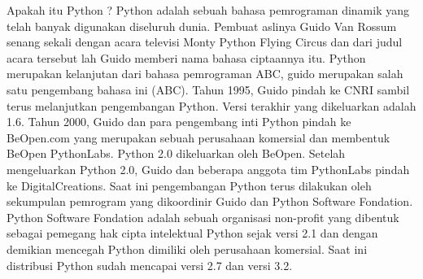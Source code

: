 {\fontsize{14pt}{14pt}\selectfont Apakah itu Python ?\vspace{\baselineskip}
Python adalah sebuah bahasa pemrograman dinamik yang telah banyak\vspace{\baselineskip}
digunakan diseluruh dunia. Pembuat aslinya Guido Van Rossum senang sekali dengan\vspace{\baselineskip}
acara televisi Monty Python Flying Circus dan dari judul acara tersebut lah Guido\vspace{\baselineskip}
memberi nama bahasa ciptaannya itu. Python merupakan kelanjutan dari bahasa\vspace{\baselineskip}
pemrograman ABC, guido merupakan salah satu pengembang bahasa ini (ABC).\vspace{\baselineskip}
Tahun 1995, Guido pindah ke CNRI sambil terus melanjutkan pengembangan\vspace{\baselineskip}
Python. Versi terakhir yang dikeluarkan adalah 1.6. Tahun 2000, Guido dan para\vspace{\baselineskip}
pengembang inti Python pindah ke BeOpen.com yang merupakan sebuah perusahaan\vspace{\baselineskip}
komersial dan membentuk BeOpen PythonLabs. Python 2.0 dikeluarkan oleh BeOpen.\vspace{\baselineskip}
Setelah mengeluarkan Python 2.0, Guido dan beberapa anggota tim PythonLabs\vspace{\baselineskip}
pindah ke DigitalCreations.\vspace{\baselineskip}
Saat ini pengembangan Python terus dilakukan oleh sekumpulan pemrogram\vspace{\baselineskip}
yang dikoordinir Guido dan Python Software Fondation. Python Software Fondation\vspace{\baselineskip}
adalah sebuah organisasi non-profit yang dibentuk sebagai pemegang hak cipta\vspace{\baselineskip}
intelektual Python sejak versi 2.1 dan dengan demikian mencegah Python dimiliki oleh\vspace{\baselineskip}
perusahaan komersial. Saat ini distribusi Python sudah mencapai versi 2.7 dan versi 3.2. \\} \par
\noindent 
